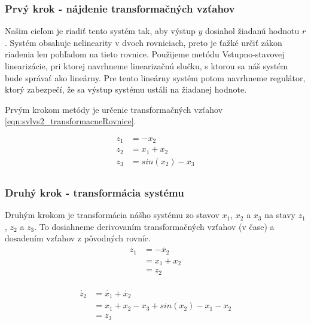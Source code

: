 \documentclass[../main.tex]{subfiles}
\begin{document}
    \subsubsection{Prvý krok - nájdenie transformačných vzťahov}
	Našim cieľom je riadiť tento systém tak, aby výstup $y$ dosiahol žiadanú hodnotu $r$. Systém obsahuje nelinearity v dvoch rovniciach, preto je ťažké určiť zákon riadenia len pohľadom na tieto rovnice. Použijeme metódu Vstupno-stavovej linearizácie, pri ktorej navrhneme linearizačnú slučku, s ktorou sa náš systém bude správať ako lineárny. Pre tento lineárny systém potom navrhneme regulátor, ktorý zabezpečí, že sa výstup systému ustáli na žiadanej hodnote.

Prvým krokom metódy je určenie transformačných vzťahov \cref{eqn:svlvs2_transformacneRovnice}.

	\begin{equation}
		\begin{aligned}
		z_1 &= -x_2 													\\
		z_2 &= x_1 + x_2												\\
		z_3 &= sin(x_2) - x_3 											\\
		\end{aligned}
		\label{eqn:svlvs2_transformacneRovnice}
	\end{equation}

    \subsubsection{Druhý krok - transformácia systému}
Druhým krokom je transformácia nášho systému zo stavov $x_1$, $x_2$ a $x_3$ na stavy $z_1$, $z_2$ a $z_3$. To dosiahneme derivovaním transformačných vzťahov (v čase) a dosadením vzťahov z pôvodných rovníc.
	\begin{equation}
        \begin{aligned}
        \dot{z_1} &= -\dot{x_2} \\
                  &= x_1 + x_2 \\
                  &=  z_2 \\
        \end{aligned}
	\end{equation}

	\begin{equation}
        \begin{aligned}
            \dot{z_2} &= \dot{x_1} + \dot{x_2}  \\
                      & = x_1 + x_2 - x_3 + sin(x_2) - x_1 - x_2  \\
                      &= z_3 	\\
        \end{aligned}
	\end{equation}
\end{document}

